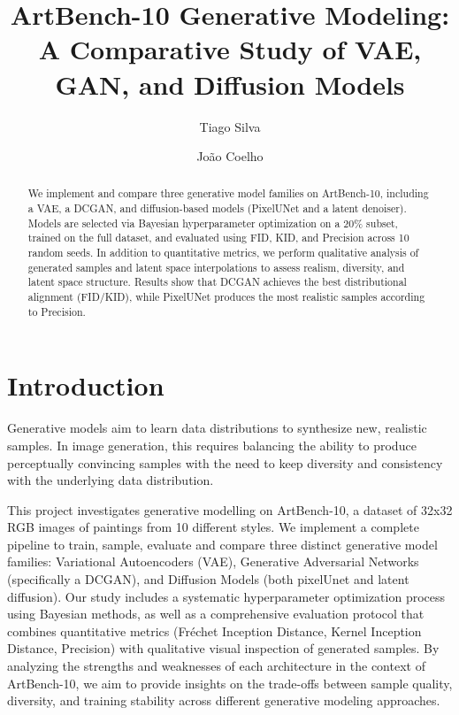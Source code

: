 \documentclass[runningheads]{llncs}
\begin{document}
\raggedbottom
\title{ArtBench-10 Generative Modeling: A Comparative Study of VAE, GAN, and Diffusion Models}
\author{Tiago Silva \and João Coelho}
\maketitle

\begin{abstract}
We implement and compare three generative model families on ArtBench-10, 
including a VAE, a DCGAN, and diffusion-based models (PixelUNet and a latent denoiser). 
Models are selected via Bayesian hyperparameter optimization on a 20\% subset, trained on the full dataset,
and evaluated using FID, KID, and Precision across 10 random seeds.  In addition to quantitative metrics, 
we perform qualitative analysis of generated samples and latent space interpolations to assess realism, diversity, and latent space structure.
Results show that DCGAN achieves the best distributional alignment (FID/KID), while PixelUNet produces the 
most realistic samples according to Precision.
\end{abstract}

\section{Introduction}

Generative models aim to learn data distributions to synthesize new, realistic samples.
In image generation, this requires balancing the ability to 
produce perceptually convincing samples with the need to keep
diversity and consistency with the underlying data distribution.

This project investigates generative modelling on ArtBench-10, a dataset of 32x32
RGB images of paintings from 10 different styles. We implement a 
complete pipeline to train, sample, evaluate and compare three distinct 
generative model families: Variational Autoencoders (VAE), 
Generative Adversarial Networks (specifically a DCGAN), and Diffusion Models (both pixelUnet and 
latent diffusion). 
Our study includes a systematic hyperparameter optimization 
process using Bayesian methods, as well as a comprehensive 
evaluation protocol that combines quantitative metrics (Fréchet 
Inception Distance, Kernel Inception Distance, Precision) with qualitative visual inspection of
generated samples. By analyzing the strengths and weaknesses of 
each architecture in the context of ArtBench-10, we aim 
to provide insights on the trade-offs between sample quality, diversity, and training stability across different generative modeling approaches.
\end{document}
